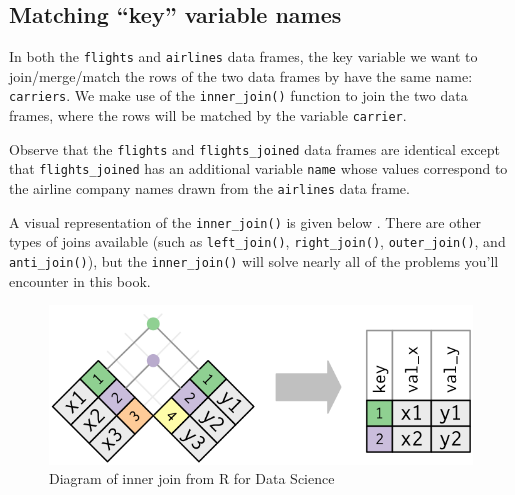 \documentclass[12pt, krantz2,]{krantz}
\makeatletter
\newenvironment{Shaded}{\begin{snugshade}}{\end{snugshade}}
\newcommand{\DataTypeTok}[1]{\textcolor[rgb]{0.27,0.27,0.27}{#1}}
\newcommand{\KeywordTok}[1]{\textcolor[rgb]{0.27,0.27,0.27}{\textbf{#1}}}
\newcommand{\NormalTok}[1]{#1}
\newcommand{\OperatorTok}[1]{\textcolor[rgb]{0.43,0.43,0.43}{\textbf{#1}}}
\newcommand{\StringTok}[1]{\textcolor[rgb]{0.5,0.5,0.5}{#1}}
\newenvironment{kframe}{%
\medskip{}
\setlength{\fboxsep}{.8em}
 \def\at@end@of@kframe{}%
 \ifinner\ifhmode%
  \def\at@end@of@kframe{\end{minipage}}%
  \begin{minipage}{\columnwidth}%
 \fi\fi%
 \def\FrameCommand##1{\hskip\@totalleftmargin \hskip-\fboxsep
 \colorbox{shadecolor}{##1}\hskip-\fboxsep
     \hskip-\linewidth \hskip-\@totalleftmargin \hskip\columnwidth}%
 \MakeFramed {\advance\hsize-\width
   \@totalleftmargin\z@ \linewidth\hsize
   \@setminipage}}%
 {\par\unskip\endMakeFramed%
 \at@end@of@kframe}
\renewenvironment{Shaded}{\begin{kframe}}{\end{kframe}}
\makeatother
\begin{document}
\hypertarget{matching-key-variable-names}{%
\subsection{Matching ``key'' variable names}\label{matching-key-variable-names}}

In both the \texttt{flights} and \texttt{airlines} data frames, the key variable we want to join/merge/match the rows of the two data frames by have the same name: \texttt{carriers}. We make use of the \texttt{inner\_join()} function to join the two data frames, where the rows will be matched by the variable \texttt{carrier}.

\begin{Shaded}
\end{Shaded}

Observe that the \texttt{flights} and \texttt{flights\_joined} data frames are identical except that \texttt{flights\_joined} has an additional variable \texttt{name} whose values correspond to the airline company names drawn from the \texttt{airlines} data frame.

A visual representation of the \texttt{inner\_join()} is given below \citep{rds2016}. There are other types of joins available (such as \texttt{left\_join()}, \texttt{right\_join()}, \texttt{outer\_join()}, and \texttt{anti\_join()}), but the \texttt{inner\_join()} will solve nearly all of the problems you'll encounter in this book.

\begin{figure}

{\centering \includegraphics[width=\textwidth]{images/join-inner} 

}

\caption{Diagram of inner join from R for Data Science}\label{fig:ijdiagram}
\end{figure}
\end{document}
